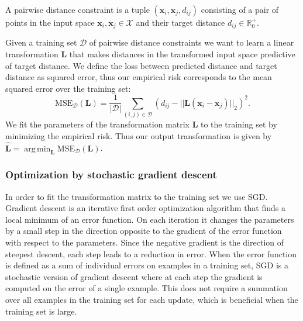 \documentclass[a4paper,titlepage]{article}
\renewcommand{\vec}[1]{\mathbf{#1}}
\newcommand{\mat}[1]{\mathbf{#1}}
\DeclareMathOperator*{\argmin}{arg\,min}
\begin{document}
A pairwise distance constraint is a tuple $(\vec{x}_i, \vec{x}_j, d_{ij})$ consisting of a pair of points in the input space $\vec{x}_i, \vec{x}_j \in \mathcal{X}$ and their target distance $d_{ij} \in \mathbb{R}_0^+$. 

Given a training set $\mathcal{D}$ of pairwise distance constraints we want to learn a linear transformation $\mat{L}$ that makes distances in the transformed input space predictive of target distance. We define the loss between predicted distance and target distance as squared error, thus our empirical risk corresponds to the mean squared error over the training set:
\begin{equation}
\text{MSE}_\mathcal{D}(\mat{L}) = \frac{1}{|\mathcal{D}|}\sum_{(i,j) \in \mathcal{D}} \left ( d_{ij} - ||\mat{L} (\vec{x}_i - \vec{x}_j)||_2 \right)^2.
\label{eq:mse}
\end{equation}
We fit the parameters of the transformation matrix $\mat{L}$ to the training set by minimizing the empirical risk. Thus our output transformation is given by $\hat{\mat{L}} = \argmin_{\mat{L}} \text{MSE}_\mathcal{D}(\mat{L})$. 

\subsubsection{Optimization by stochastic gradient descent}

In order to fit the transformation matrix to the training set we use \acf{SGD}. Gradient descent is an iterative first order optimization algorithm that finds a local minimum of an error function. On each iteration it changes the parameters by a small step in the direction opposite to the gradient of the error function with respect to the parameters. Since the negative gradient is the direction of steepest descent, each step leads to a reduction in error. When the error function is defined as a sum of individual errors on examples in a training set, \ac{SGD} is a stochastic version of gradient descent where at each step the gradient is computed on the error of a single example. This does not require a summation over all examples in the training set for each update, which is beneficial when the training set is large. 
\end{document}
